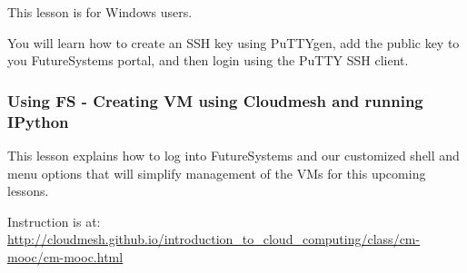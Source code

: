 This lesson is for Windows users.

You will learn how to create an SSH key using PuTTYgen, add the public
key to you FutureSystems portal, and then login using the PuTTY SSH
client.


\subsubsection{Using FS - Creating VM using Cloudmesh and running
IPython}\label{using-fs---creating-vm-using-cloudmesh-and-running-ipython}

This lesson explains how to log into FutureSystems and our customized
shell and menu options that will simplify management of the VMs for this
upcoming lessons.

Instruction is at:
\url{http://cloudmesh.github.io/introduction_to_cloud_computing/class/cm-mooc/cm-mooc.html}

